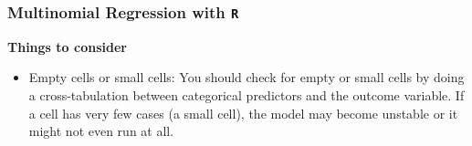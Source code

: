 \documentclass[00-GLMregslides.tex]{subfiles}
\begin{document}
\begin{frame}[fragile]
	
	\frametitle{Multinomial Regression with \texttt{R}}
	\Large
	\textbf{Things to consider}
	\begin{itemize}
\item Empty cells or small cells: You should check for empty or small cells by doing a cross-tabulation between categorical predictors and the outcome variable. If a cell has very few cases (a small cell), the model may become unstable or it might not even run at all.
\end{itemize}

\end{frame}
\end{document}
